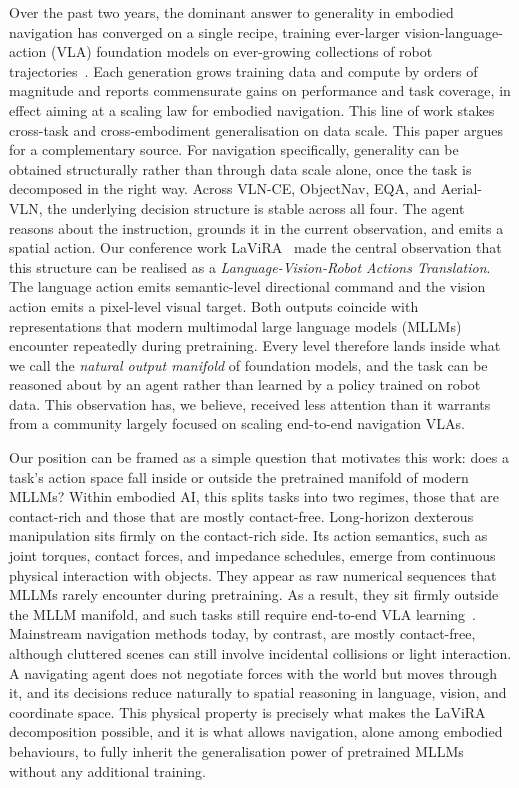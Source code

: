 \documentclass[conference]{IEEEtran}
\begin{document}
Over the past two years, the dominant answer to generality in embodied
navigation has converged on a single recipe, training ever-larger
vision-language-action (VLA) foundation models on ever-growing collections of
robot trajectories~\cite{zhang2024navid,
zhang2024uninavid,cheng2024navila,wei2025streamvln,zhang2025navfom}. Each
generation grows training data and compute by orders of magnitude and reports
commensurate gains on performance and task coverage, in effect aiming at a
scaling law for embodied navigation. This line of work stakes cross-task and
cross-embodiment generalisation on data scale. {This paper argues for a
complementary source.} For navigation specifically, generality can be obtained
structurally rather than through data scale alone, once the task is decomposed
in the right way. Across VLN-CE, ObjectNav, EQA, and Aerial-VLN, the
underlying decision structure is stable across all four. The agent reasons
about the instruction, grounds it in the current observation, and emits a
spatial action. {Our conference work LaViRA~\cite{ding2025lavira} made the
central observation that this structure can be realised as a
\emph{Language-Vision-Robot Actions Translation}. The language action emits
semantic-level directional command and the vision action emits a pixel-level
visual target. Both outputs coincide with representations that modern
multimodal large language models (MLLMs) encounter repeatedly during
pretraining.} Every level therefore lands inside what we call the
\emph{natural output manifold} of foundation models, and the task can be
reasoned about by an agent rather than learned by a policy trained on robot
data. {This observation has, we believe, received less attention than it
warrants from a community largely focused on scaling end-to-end navigation
VLAs.}

Our position can be framed as a simple question that motivates this work: does
a task's action space fall inside or outside the pretrained manifold of modern
MLLMs? Within embodied AI, this splits tasks into two regimes, those that are
contact-rich and those that are mostly contact-free. Long-horizon dexterous
manipulation sits firmly on the contact-rich side. Its action semantics, such
as joint torques, contact forces, and impedance schedules, emerge from
continuous physical interaction with objects. They appear as raw numerical
sequences that MLLMs rarely encounter during pretraining. As a result, they
sit firmly outside the MLLM manifold, and such tasks still require end-to-end
VLA learning~\cite{black2024pi0,kim2024openvla}. Mainstream navigation methods
today, by contrast, are mostly contact-free, although cluttered scenes can
still involve incidental collisions or light interaction. A navigating agent
does not negotiate forces with the world but moves through it, and its
decisions reduce naturally to spatial reasoning in language, vision, and
coordinate space. {This physical property is precisely what makes the LaViRA
decomposition possible, and it is what allows navigation, alone among embodied
behaviours, to fully inherit the generalisation power of pretrained MLLMs
without any additional training.}
\end{document}
